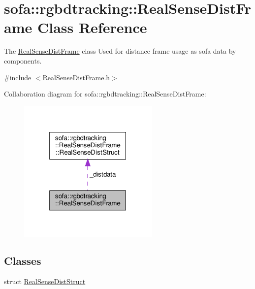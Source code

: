 \hypertarget{classsofa_1_1rgbdtracking_1_1_real_sense_dist_frame}{}\section{sofa\+:\+:rgbdtracking\+:\+:Real\+Sense\+Dist\+Frame Class Reference}
\label{classsofa_1_1rgbdtracking_1_1_real_sense_dist_frame}


The \hyperlink{classsofa_1_1rgbdtracking_1_1_real_sense_dist_frame}{Real\+Sense\+Dist\+Frame} class Used for distance frame usage as sofa data by components.  




{\ttfamily \#include $<$Real\+Sense\+Dist\+Frame.\+h$>$}



Collaboration diagram for sofa\+:\+:rgbdtracking\+:\+:Real\+Sense\+Dist\+Frame\+:
\nopagebreak
\begin{figure}[H]
\begin{center}
\leavevmode
\includegraphics[width=196pt]{classsofa_1_1rgbdtracking_1_1_real_sense_dist_frame__coll__graph}
\end{center}
\end{figure}
\subsection*{Classes}
\begin{DoxyCompactItemize}
\item 
struct \hyperlink{structsofa_1_1rgbdtracking_1_1_real_sense_dist_frame_1_1_real_sense_dist_struct}{Real\+Sense\+Dist\+Struct}
\end{DoxyCompactItemize}
